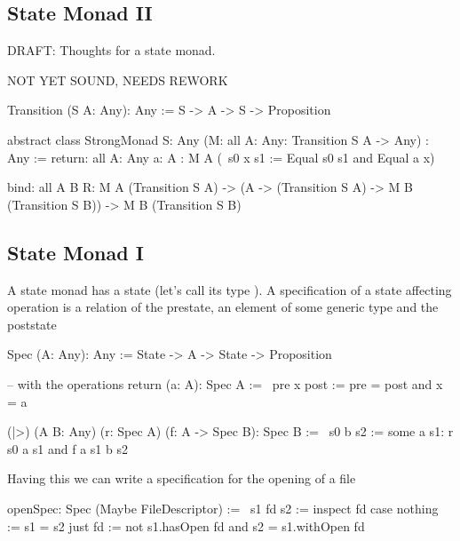 \subsection{State Monad II}


\noindent DRAFT: Thoughts for a state monad.

NOT YET SOUND, NEEDS REWORK


\begin{alba}
    Transition (S A: Any): Any :=
        S -> A -> S -> Proposition


    abstract class
        StrongMonad
            {S: Any}
            (M: all {A: Any}: Transition S A -> Any)
            : Any
    :=
        return:
            all
                {A: Any}
                {a: A}
                : M A (\ s0 x s1 := Equal s0 s1 and Equal a x)

        bind:
            all {A B R}:
                M A (Transition S A)
                -> (A -> (Transition S A) -> M B (Transition S B))
                -> M B (Transition S B)
\end{alba}







\subsection {State Monad I}

A state monad has a state (let's call its type ). A specification of
a state affecting operation is a relation of the prestate, an element of some
generic type and the poststate
%
\begin{alba}
    Spec (A: Any): Any :=
        State -> A -> State -> Proposition

    -- with the operations
    return (a: A): Spec A :=
        \ pre x post :=
            pre = post and x = a

    (|>) (A B: Any) (r: Spec A) (f: A -> Spec B): Spec B :=
        \ s0 b s2 :=
            some a s1:
                r s0 a s1
                and f a s1 b s2
\end{alba}

Having this we can write a specification for the opening of a file

\begin{alba}
    openSpec: Spec (Maybe FileDescriptor) :=
        \ s1 fd s2 :=
            inspect fd case
                nothing :=
                    s1 = s2
                just fd :=
                    not s1.hasOpen fd
                    and
                    s2 = s1.withOpen fd
\end{alba}

